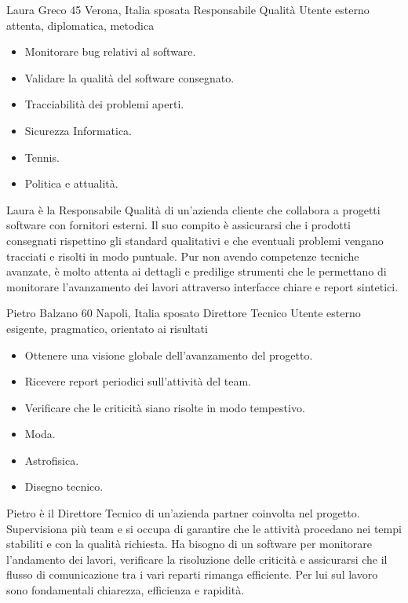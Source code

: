 \begin{personaenv}
    {Laura Greco}
    {45}
    {Verona, Italia}
    {sposata}
    {Responsabile Qualità}
    {Utente esterno}
    {attenta, diplomatica, metodica}
    {\begin{itemize}
        \item Monitorare bug relativi al software.
        \item Validare la qualità del software consegnato.
        \item Tracciabilità dei problemi aperti.
    \end{itemize}}
    {\begin{itemize}
        \item Sicurezza Informatica.
        \item Tennis.
        \item Politica e attualità.
    \end{itemize}}
    {Laura è la Responsabile Qualità di un’azienda cliente che collabora a progetti software con fornitori esterni. 
    Il suo compito è assicurarsi che i prodotti consegnati rispettino gli standard qualitativi e che eventuali problemi 
    vengano tracciati e risolti in modo puntuale. Pur non avendo competenze tecniche avanzate, è molto attenta ai dettagli e 
    predilige strumenti che le permettano di monitorare l’avanzamento dei lavori attraverso interfacce chiare e report sintetici.}
\end{personaenv}

\begin{personaenv}
    {Pietro Balzano} 
    {60}
    {Napoli, Italia}
    {sposato}
    {Direttore Tecnico}
    {Utente esterno}
    {esigente, pragmatico, orientato ai risultati}
    {\begin{itemize}
        \item Ottenere una visione globale dell’avanzamento del progetto.
        \item Ricevere report periodici sull’attività del team.
        \item Verificare che le criticità siano risolte in modo tempestivo.
    \end{itemize}}
    {\begin{itemize}
        \item Moda.
        \item Astrofisica.
        \item Disegno tecnico.
    \end{itemize}}
    {Pietro è il Direttore Tecnico di un’azienda partner coinvolta nel progetto. Supervisiona più team e si occupa di garantire che 
    le attività procedano nei tempi stabiliti e con la qualità richiesta. Ha bisogno di un software per monitorare l’andamento dei lavori, 
    verificare la risoluzione delle criticità e assicurarsi che il flusso di comunicazione tra i vari reparti rimanga efficiente. Per lui 
    sul lavoro sono fondamentali chiarezza, efficienza e rapidità.} 
\end{personaenv}